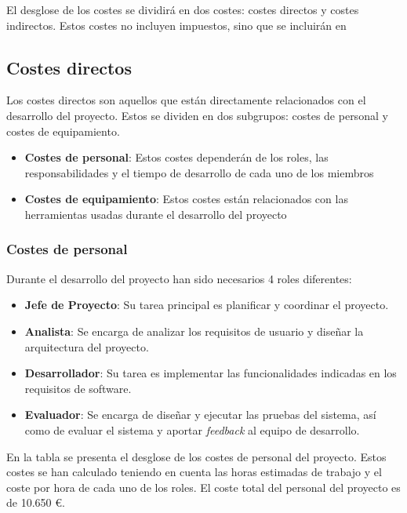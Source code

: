 El desglose de los costes se dividirá en dos costes: costes directos y costes indirectos. Estos costes no incluyen impuestos, sino que se incluirán en 

\subsection{Costes directos}\label{subsec:costes_directos}

Los costes directos son aquellos que están directamente relacionados con el desarrollo del proyecto. Estos se dividen en dos subgrupos: costes de personal y costes de equipamiento.
\begin{itemize}
    \item \textbf{Costes de personal}: Estos costes dependerán de los roles, las responsabilidades y el tiempo de desarrollo de cada uno de los miembros
    \item \textbf{Costes de equipamiento}: Estos costes están relacionados con las herramientas usadas durante el desarrollo del proyecto
\end{itemize}

\subsubsection{Costes de personal}
Durante el desarrollo del proyecto han sido necesarios 4 roles diferentes:
\begin{itemize}
    \item \textbf{Jefe de Proyecto}: Su tarea principal es planificar y coordinar el proyecto.
    \item \textbf{Analista}: Se encarga de analizar los requisitos de usuario y diseñar la arquitectura del proyecto.
    \item \textbf{Desarrollador}: Su tarea es implementar las funcionalidades indicadas en los requisitos de software.
    \item \textbf{Evaluador}: Se encarga de diseñar y ejecutar las pruebas del sistema, así como de evaluar el sistema y aportar \textit{feedback} al equipo de desarrollo.
\end{itemize}

En la tabla  se presenta el desglose de los costes de personal del proyecto. Estos costes se han calculado teniendo en cuenta las horas estimadas de trabajo y el coste por hora de cada uno de los roles. El coste total del personal del proyecto es de 10.650 \euro.

